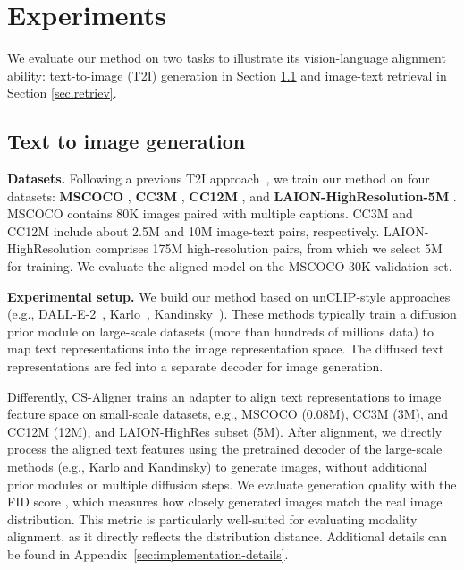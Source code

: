 \section{Experiments}
\label{sec:exp}

We evaluate our method on two tasks to illustrate its vision-language alignment ability: text-to-image (T2I) generation in Section \ref{sec.t2i} and image-text retrieval in Section \ref{sec.retriev}.


\subsection{Text to image generation}
\label{sec.t2i}
\noindent\textbf{Datasets.} Following a previous T2I approach~\citep{patel2024eclipse}, we train our method on four datasets: \textbf{MSCOCO} \citep{lin2014microsoft}, \textbf{CC3M} \citep{sharma2018conceptual}, \textbf{CC12M} \citep{changpinyo2021conceptual}, and \textbf{LAION-HighResolution-5M} \citep{schuhmann2022laion}. MSCOCO contains 80K images paired with multiple captions. CC3M and CC12M include about 2.5M and 10M image-text pairs, respectively. LAION-HighResolution comprises 175M high-resolution pairs, from which we select 5M for training. We evaluate the aligned model on the MSCOCO 30K validation set.

\noindent\textbf{Experimental setup.} 
We build our method based on unCLIP-style approaches (e.g., DALL-E-2~\citep{ramesh2022hierarchical}, Karlo~\citep{kakaobrain2022karlo-v1-alpha}, Kandinsky~\citep{razzhigaev2023kandinsky}). These methods typically train a diffusion prior module on large-scale datasets (more than hundreds of millions data) to map text representations into the image representation space.
The diffused text representations are fed into a separate decoder for image generation. 

Differently, 
CS-Aligner trains an adapter to align text representations to image feature space on small-scale datasets, e.g., MSCOCO (0.08M), CC3M (3M), and CC12M (12M), and LAION-HighRes subset (5M).
After alignment, we directly process the aligned text features using the pretrained decoder of the large-scale methods (e.g., Karlo and Kandinsky) to generate images, without additional prior modules or multiple diffusion steps.
% 
We evaluate generation quality with the FID score \citep{heusel2017gans}, which measures how closely generated images match the real image distribution. 
This metric is particularly well-suited for evaluating modality alignment, as it directly reflects the distribution distance. 
Additional details can be found in {Appendix~\ref{sec:implementation-details}}.

